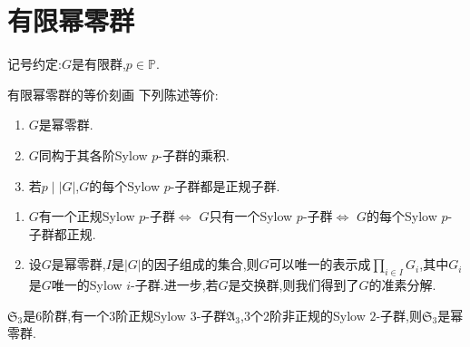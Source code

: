\section{有限幂零群}

记号约定:$G$是有限群,$p\in\mathbb{P}$.

\begin{theorem}{有限幂零群的等价刻画}{}
	下列陈述等价:
	\begin{enumerate}
		\item $G$是幂零群.
		\item $G$同构于其各阶Sylow $p$-子群的乘积.
		\item 若$p\mid\left|G\right|$,$G$的每个Sylow $p$-子群都是正规子群.
	\end{enumerate}
\end{theorem}

\begin{remark}{}{}
	\begin{enumerate}
		\item $G$有一个正规Sylow $p$-子群$\iff$ $G$只有一个Sylow $p$-子群$\iff$ $G$的每个Sylow $p$-子群都正规.
		\item 设$G$是幂零群,$I$是$\left|G\right|$的因子组成的集合,则$G$可以唯一的表示成$\prod\limits_{i\in I}G_{i}$,其中$G_{i}$是$G$唯一的Sylow $i$-子群.进一步,若$G$是交换群,则我们得到了$G$的准素分解.
	\end{enumerate}
\end{remark}

\begin{example}{}{}
	$\mathfrak{S}_{3}$是$6$阶群,有一个$3$阶正规Sylow $3$-子群$\mathfrak{A}_{3}$,$3$个$2$阶非正规的Sylow $2$-子群,则$\mathfrak{S}_{3}$是幂零群.
\end{example}

























